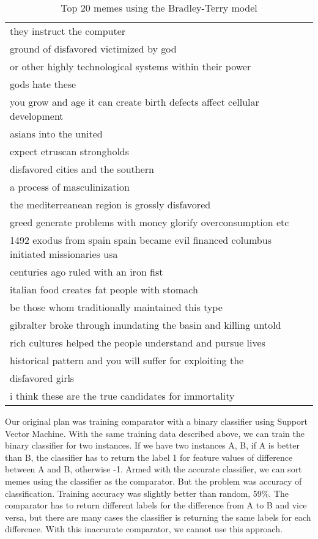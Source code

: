 \documentclass{sig-alternate}
\begin{document}
\begin{table*}[h!b!p!]
\begin{center}
\begin{tabular}{|p{15cm}|}
\hline
they instruct the computer\\
ground of disfavored victimized by god\\
or other highly technological systems within their power\\
gods hate these\\
you grow and age it can create birth defects affect cellular development\\
asians into the united\\
expect etruscan strongholds\\
disfavored cities and the southern\\
a process of masculinization\\
the mediterreanean region is grossly disfavored\\
greed generate problems with money glorify overconsumption etc\\
1492 exodus from spain spain became evil financed columbus initiated missionaries usa\\
centuries ago ruled with an iron fist\\
italian food creates fat people with stomach\\
be those whom traditionally maintained this type\\
gibralter broke through inundating the basin and killing untold\\
rich cultures helped the people understand and pursue lives\\
historical pattern and you will suffer for exploiting the\\
disfavored girls\\
i think these are the true candidates for immortality\\
\hline
\end{tabular}
\caption{Top 20 memes using the Bradley-Terry model}
\label{table:bt_result}
\end{center}
\end{table*}

Our original plan was training comparator with a binary classifier using Support Vector Machine. With the same training data described above, we can train the binary classifier for two instances. If we have two instances A, B, if A is better than B, the classifier has to return the label 1 for feature values of difference between A and B, otherwise -1. Armed with the accurate classifier, we can sort memes using the classifier as the comparator. But the problem was accuracy of classification. Training accuracy was slightly better than random, 59\%. The comparator has to return different labels for the difference from A to B and vice versa, but there are many cases the classifier is returning the same labels for each difference. With this inaccurate comparator, we cannot use this approach.
\end{document}
